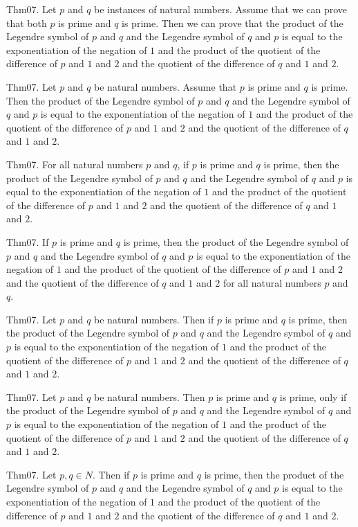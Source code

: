 \documentclass{article}
\begin{document}
Thm07. Let $p$ and $q$ be instances of natural numbers. Assume that we can prove that both $p$ is prime and $q$ is prime. Then we can prove that the product of the Legendre symbol of $p$ and $q$ and the Legendre symbol of $q$ and $p$ is equal to the exponentiation of the negation of $1$ and the product of the quotient of the difference of $p$ and $1$ and $2$ and the quotient of the difference of $q$ and $1$ and $2$.

Thm07. Let $p$ and $q$ be natural numbers. Assume that $p$ is prime and $q$ is prime. Then the product of the Legendre symbol of $p$ and $q$ and the Legendre symbol of $q$ and $p$ is equal to the exponentiation of the negation of $1$ and the product of the quotient of the difference of $p$ and $1$ and $2$ and the quotient of the difference of $q$ and $1$ and $2$.

Thm07. For all natural numbers $p$ and $q$, if $p$ is prime and $q$ is prime, then the product of the Legendre symbol of $p$ and $q$ and the Legendre symbol of $q$ and $p$ is equal to the exponentiation of the negation of $1$ and the product of the quotient of the difference of $p$ and $1$ and $2$ and the quotient of the difference of $q$ and $1$ and $2$.

Thm07. If $p$ is prime and $q$ is prime, then the product of the Legendre symbol of $p$ and $q$ and the Legendre symbol of $q$ and $p$ is equal to the exponentiation of the negation of $1$ and the product of the quotient of the difference of $p$ and $1$ and $2$ and the quotient of the difference of $q$ and $1$ and $2$ for all natural numbers $p$ and $q$.

Thm07. Let $p$ and $q$ be natural numbers. Then if $p$ is prime and $q$ is prime, then the product of the Legendre symbol of $p$ and $q$ and the Legendre symbol of $q$ and $p$ is equal to the exponentiation of the negation of $1$ and the product of the quotient of the difference of $p$ and $1$ and $2$ and the quotient of the difference of $q$ and $1$ and $2$.

Thm07. Let $p$ and $q$ be natural numbers. Then $p$ is prime and $q$ is prime, only if the product of the Legendre symbol of $p$ and $q$ and the Legendre symbol of $q$ and $p$ is equal to the exponentiation of the negation of $1$ and the product of the quotient of the difference of $p$ and $1$ and $2$ and the quotient of the difference of $q$ and $1$ and $2$.

Thm07. Let $p , q \in N$. Then if $p$ is prime and $q$ is prime, then the product of the Legendre symbol of $p$ and $q$ and the Legendre symbol of $q$ and $p$ is equal to the exponentiation of the negation of $1$ and the product of the quotient of the difference of $p$ and $1$ and $2$ and the quotient of the difference of $q$ and $1$ and $2$.
\end{document}

